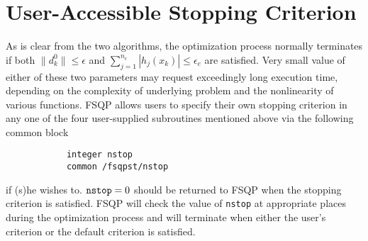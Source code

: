 \section{User-Accessible Stopping Criterion}
\label{stopcri}
As is clear from the two algorithms, the optimization process
normally terminates if both 
$\|d_k^0\|\leq\epsilon$
and $\sum_{j=1}^{n_e}|h_j(x_k)|\leq\epsilon_e$ are satisfied. 
Very small value of either of these two parameters may request
exceedingly long execution time, depending on the complexity
of underlying problem and the nonlinearity of various functions. 
FSQP allows users to specify their own stopping criterion in any one of 
the four user-supplied subroutines mentioned above via the following
common block
\begin{verbatim}
            integer nstop
            common /fsqpst/nstop
\end{verbatim}
if (s)he wishes to.
${\tt nstop}=0$ should be returned to FSQP when the stopping criterion 
is satisfied.  FSQP will check the value of {\tt nstop} at appropriate places 
during the optimization process and will terminate when
either the user's criterion or the default criterion is satisfied.

